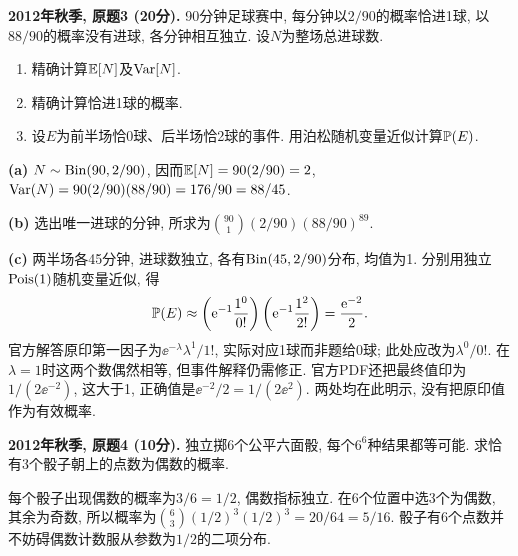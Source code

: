 \begin{exercise}\label{ex:m1-2012f-q3}
\textbf{2012年秋季, 原题3 (20分).} 90分钟足球赛中, 每分钟以$2/90$的概率恰进1球, 以$88/90$的概率没有进球, 各分钟相互独立. 设$N$为整场总进球数.
\begin{enumerate}\item[(a)]\label{ex:m1-2012f-q3-a} 精确计算$\mathbb E[N]$及$\operatorname{Var}[N]$.\item[(b)]\label{ex:m1-2012f-q3-b} 精确计算恰进1球的概率.\item[(c)]\label{ex:m1-2012f-q3-c} 设$E$为前半场恰0球、后半场恰2球的事件. 用泊松随机变量近似计算$\mathbb P(E)$.\end{enumerate}
\end{exercise}
\begin{solution}
\textbf{(a)}\label{sol:m1-2012f-q3-a} $N\sim\operatorname{Bin}(90,2/90)$, 因而$\mathbb E[N]=90(2/90)=2$, $\operatorname{Var}(N)=90(2/90)(88/90)=176/90=88/45$.

\textbf{(b)}\label{sol:m1-2012f-q3-b} 选出唯一进球的分钟, 所求为$\binom{90}{1}(2/90)(88/90)^{89}$.

\textbf{(c)}\label{sol:m1-2012f-q3-c} 两半场各45分钟, 进球数独立, 各有$\operatorname{Bin}(45,2/90)$分布, 均值为1. 分别用独立$\operatorname{Pois}(1)$随机变量近似, 得
\[
\mathbb P(E)\approx\left(\mathrm e^{-1}\frac{1^0}{0!}\right)
\left(\mathrm e^{-1}\frac{1^2}{2!}\right)=\frac{\mathrm e^{-2}}2.
\]
官方解答原印第一因子为$\ee^{-\lambda}\lambda^1/1!$, 实际对应1球而非题给0球; 此处应改为$\lambda^0/0!$. 在$\lambda=1$时这两个数偶然相等, 但事件解释仍需修正. 官方PDF还把最终值印为$1/(2\ee^{-2})$, 这大于1, 正确值是$\ee^{-2}/2=1/(2\ee^2)$. 两处均在此明示, 没有把原印值作为有效概率.
\end{solution}

\begin{exercise}\label{ex:m1-2012f-q4}
\textbf{2012年秋季, 原题4 (10分).} 独立掷6个公平六面骰, 每个$6^6$种结果都等可能. 求恰有3个骰子朝上的点数为偶数的概率.
\end{exercise}
\begin{solution}
\label{sol:m1-2012f-q4}
每个骰子出现偶数的概率为$3/6=1/2$, 偶数指标独立. 在6个位置中选3个为偶数, 其余为奇数, 所以概率为$\binom63(1/2)^3(1/2)^3=20/64=5/16$. 骰子有6个点数并不妨碍偶数计数服从参数为$1/2$的二项分布.
\end{solution}

